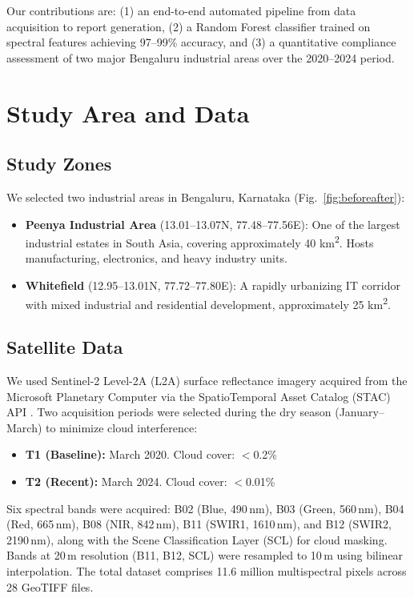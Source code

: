 \documentclass[conference,10pt]{IEEEtran}
\begin{document}
Our contributions are: (1) an end-to-end automated pipeline from data acquisition to report generation, (2) a Random Forest classifier trained on spectral features achieving 97--99\% accuracy, and (3) a quantitative compliance assessment of two major Bengaluru industrial areas over the 2020--2024 period.

\section{Study Area and Data}

\subsection{Study Zones}

We selected two industrial areas in Bengaluru, Karnataka (Fig.~\ref{fig:beforeafter}):

\begin{itemize}
    \item \textbf{Peenya Industrial Area} (13.01--13.07\textdegree N, 77.48--77.56\textdegree E): One of the largest industrial estates in South Asia, covering approximately 40 km\textsuperscript{2}. Hosts manufacturing, electronics, and heavy industry units.
    \item \textbf{Whitefield} (12.95--13.01\textdegree N, 77.72--77.80\textdegree E): A rapidly urbanizing IT corridor with mixed industrial and residential development, approximately 25 km\textsuperscript{2}.
\end{itemize}

\subsection{Satellite Data}

We used Sentinel-2 Level-2A (L2A) surface reflectance imagery acquired from the Microsoft Planetary Computer via the SpatioTemporal Asset Catalog (STAC) API \cite{pc2023}. Two acquisition periods were selected during the dry season (January--March) to minimize cloud interference:

\begin{itemize}
    \item \textbf{T1 (Baseline):} March 2020. Cloud cover: $<$0.2\%
    \item \textbf{T2 (Recent):} March 2024. Cloud cover: $<$0.01\%
\end{itemize}

Six spectral bands were acquired: B02 (Blue, 490\,nm), B03 (Green, 560\,nm), B04 (Red, 665\,nm), B08 (NIR, 842\,nm), B11 (SWIR1, 1610\,nm), and B12 (SWIR2, 2190\,nm), along with the Scene Classification Layer (SCL) for cloud masking. Bands at 20\,m resolution (B11, B12, SCL) were resampled to 10\,m using bilinear interpolation. The total dataset comprises 11.6 million multispectral pixels across 28 GeoTIFF files.
\end{document}
